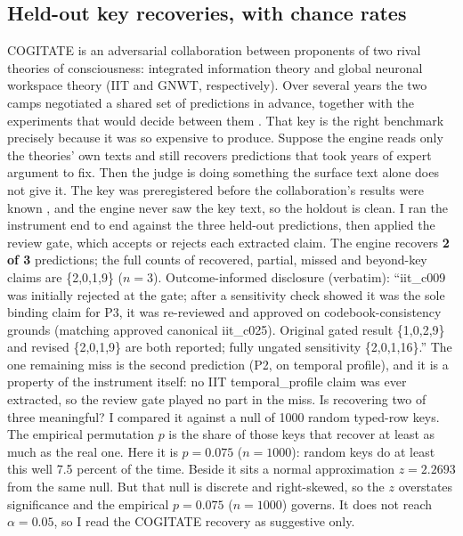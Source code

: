 \documentclass[11pt]{article}
\begin{document}
\subsection{Held-out key recoveries, with chance rates}
COGITATE is an adversarial collaboration between proponents of two rival theories of consciousness:
integrated information theory and global neuronal workspace theory (IIT and GNWT, respectively). Over
several years the two camps negotiated a shared set of predictions in advance, together with the
experiments that would decide between them \cite{cogitate2025}. That key is the right benchmark precisely
because it was so expensive to produce. Suppose the engine reads only the theories' own texts and still
recovers predictions that took years of expert argument to fix. Then the judge is doing something the
surface text alone does not give it. The key was preregistered before the collaboration's results were known
\cite{cogitate_prereg}, and the engine never saw the key text, so the holdout is clean. I ran the
instrument end to end against the three held-out predictions, then applied the review gate, which accepts
or rejects each extracted claim. The engine recovers \textbf{2 of 3} predictions; the full counts of
recovered, partial, missed and beyond-key claims are \{2,0,1,9\} ($n = 3$). Outcome-informed disclosure
(verbatim): ``iit\_c009 was initially rejected at the gate; after a sensitivity check showed it was the
sole binding claim for P3, it was re-reviewed and approved on codebook-consistency grounds (matching
approved canonical iit\_c025). Original gated result \{1,0,2,9\} and revised \{2,0,1,9\} are both reported;
fully ungated sensitivity \{2,0,1,16\}.'' The one remaining miss is the second prediction (P2, on temporal
profile), and it is a property of the instrument itself: no IIT temporal\_profile claim was ever
extracted, so the review gate played no part in the miss. Is recovering two of three meaningful? I compared
it against a null of 1000 random typed-row
keys. The empirical permutation $p$ is the share of those keys that recover at least as much as the real
one. Here it is \textbf{$p = 0.075$} ($n = 1000$): random keys do at least this well 7.5 percent of the
time. Beside it sits a normal approximation $z = 2.2693$ from the same
null.
But that null is discrete and right-skewed, so the $z$ overstates significance and the empirical
\textbf{$p = 0.075$} ($n = 1000$) governs. It does not reach $\alpha = 0.05$, so I read the COGITATE
recovery as suggestive only.
\end{document}

